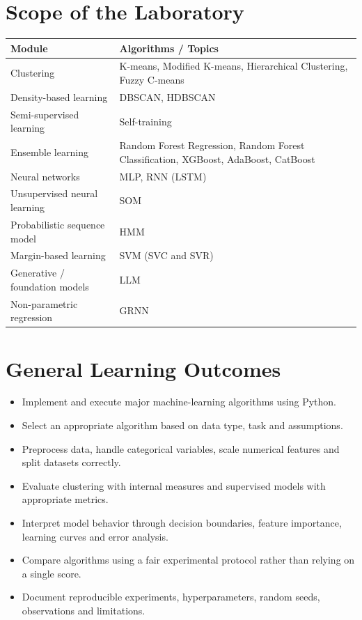 \section*{Scope of the Laboratory}
{}
\begin{longtable}{|p{}|p{}|}
\hline
\rowcolor{mlblue!8}\textbf{Module} & \textbf{Algorithms / Topics} \\
\hline
\endhead
Clustering & K-means, Modified K-means, Hierarchical Clustering, Fuzzy C-means \\
\hline
Density-based learning & DBSCAN, HDBSCAN \\
\hline
Semi-supervised learning & Self-training \\
\hline
Ensemble learning & Random Forest Regression, Random Forest Classification, XGBoost, AdaBoost, CatBoost \\
\hline
Neural networks & MLP, RNN (LSTM) \\
\hline
Unsupervised neural learning & SOM \\
\hline
Probabilistic sequence model & HMM \\
\hline
Margin-based learning & SVM (SVC and SVR) \\
\hline
Generative / foundation models & LLM \\
\hline
Non-parametric regression & GRNN \\
\hline
\end{longtable}

\section*{General Learning Outcomes}
{}
\begin{itemize}
  \item Implement and execute major machine-learning algorithms using Python.
  \item Select an appropriate algorithm based on data type, task and assumptions.
  \item Preprocess data, handle categorical variables, scale numerical features and split datasets correctly.
  \item Evaluate clustering with internal measures and supervised models with appropriate metrics.
  \item Interpret model behavior through decision boundaries, feature importance, learning curves and error analysis.
  \item Compare algorithms using a fair experimental protocol rather than relying on a single score.
  \item Document reproducible experiments, hyperparameters, random seeds, observations and limitations.
\end{itemize}

